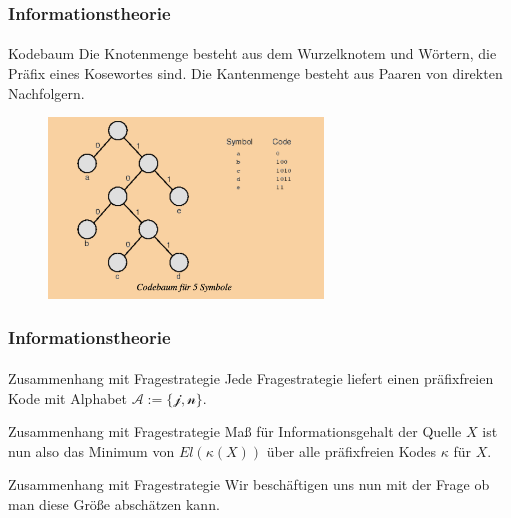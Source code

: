 \documentclass{beamer}
\begin{document}
\begin{frame}
    \frametitle{Informationstheorie}
\framesubtitle{}

\begin{block}{Kodebaum}
Die Knotenmenge besteht aus dem Wurzelknotem und Wörtern, die Präfix eines Kosewortes sind. Die Kantenmenge besteht aus Paaren von direkten Nachfolgern.
\end{block}
\begin{figure}[htp]
      \centering
    \includegraphics[width=0.65\textwidth]{img/Kodebaum}
\end{figure}
 \end{frame}



\begin{frame}
    \frametitle{Informationstheorie}
\framesubtitle{}

\begin{block}{Zusammenhang mit Fragestrategie}
Jede Fragestrategie liefert einen präfixfreien Kode mit Alphabet $\mathcal{A := \{  \text{j} ,\text{n} \}}$.
\end{block}

\begin{block}{Zusammenhang mit Fragestrategie}
Maß für Informationsgehalt der Quelle $X$ ist nun also das Minimum von $El(\kappa (X))$ über alle präfixfreien Kodes $\kappa$ für $X$.
\end{block}

\begin{block}{Zusammenhang mit Fragestrategie}
Wir beschäftigen uns nun mit der Frage ob  man diese Größe abschätzen kann.
\end{block}


 \end{frame}
\end{document}
